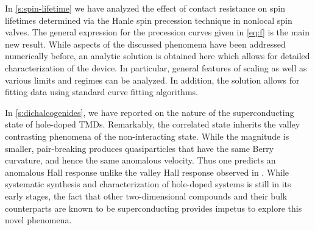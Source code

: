 
In \cref{s:spin-lifetime} we have analyzed the effect of contact resistance
on spin lifetimes determined via the Hanle spin precession technique
in nonlocal spin valves.
The general expression for the precession curves given
in \cref{eq:f} is the main new result.
While aspects of the discussed phenomena have been addressed numerically before,
an analytic solution is obtained here
which allows for detailed characterization of the device.
In particular, general features of scaling
as well as various limits and regimes can be analyzed.
In addition, the solution allows for fitting data
using standard curve fitting algorithms.

In \cref{s:dichalcogenides}, we have reported on the
nature of the superconducting state of hole-doped TMDs.
Remarkably, the correlated state inherits
the valley contrasting phenomena of the non-interacting state.
While the magnitude is smaller, pair-breaking produces quasiparticles
that have the same Berry curvature, and hence the same anomalous velocity.
Thus one predicts an anomalous Hall response unlike the valley Hall response
observed in .
While systematic synthesis and characterization of hole-doped systems
is still in its early stages, the fact that other two-dimensional compounds
and their bulk counterparts are known to be superconducting
\cite{PhysRevB.88.054515}
provides impetus to explore this novel phenomena.
